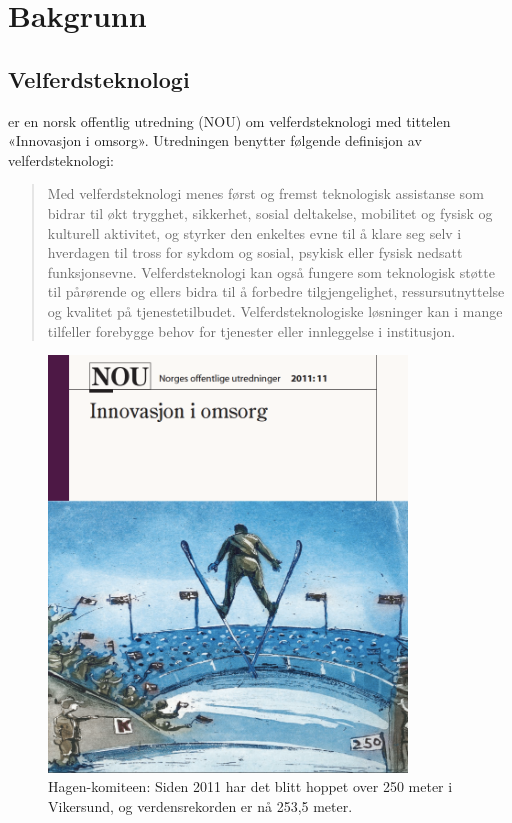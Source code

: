 \chapter[Bakgrunn]{Bakgrunn}
\label{ch:background}
\blindtext

\section{Velferdsteknologi}
\citet{regjeringen_hagen} er en norsk offentlig utredning (NOU) om velferdsteknologi med tittelen «Innovasjon i omsorg».
Utredningen benytter følgende definisjon av velferdsteknologi:

\blockquote{
Med velferdsteknologi menes først og fremst
teknologisk assistanse som bidrar til økt trygghet,
sikkerhet, sosial deltakelse, mobilitet og
fysisk og kulturell aktivitet, og styrker den
enkeltes evne til å klare seg selv i hverdagen til
tross for sykdom og sosial, psykisk eller fysisk
nedsatt funksjonsevne. Velferdsteknologi kan
også fungere som teknologisk støtte til pårørende og
ellers bidra til å forbedre tilgjengelighet,
ressursutnyttelse og kvalitet på tjenestetilbudet.
Velferdsteknologiske løsninger kan i
mange tilfeller forebygge behov for tjenester
eller innleggelse i institusjon.
}

\begin{figure}
\includegraphics[width=0.85\textwidth,center]{fig/hagen}
\caption{Hagen-komiteen: Siden 2011 har det blitt hoppet over 250 meter i Vikersund, og verdensrekorden er nå 253,5 meter. }
\label{fig:hagen}
\end{figure}

